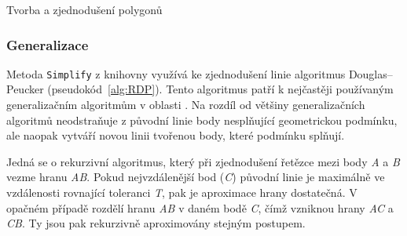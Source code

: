 \begin{algorithm}
\caption{Tvorba a zjednodušení polygonů}
\label{alg:polygon}
    \begin{algorithmic}[1] 
			\ELSE
			\ENDIF
		\ENDWHILE	
	\ENDWHILE
    \end{algorithmic}
\end{algorithm}

\newpage
\subsubsection{Generalizace}
	Metoda \texttt{Simplify} z knihovny  využívá ke zjednodušení linie algoritmus Douglas–Peucker (pseudokód~\ref{alg:RDP}). Tento algoritmus patří k nejčastěji používaným generalizačním algoritmům v oblasti . Na rozdíl od většiny generalizačních algoritmů neodstraňuje z původní linie body nesplňující geometrickou podmínku, ale naopak vytváří novou linii tvořenou body, které podmínku splňují. 
	
	Jedná se o rekurzivní algoritmus, který při zjednodušení řetězce mezi body \textit{A} a \textit{B} vezme hranu \textit{AB}. Pokud nejvzdálenější bod (\textit{C}) původní linie je maximálně ve vzdálenosti rovnající toleranci \textit{T}, pak je aproximace hrany dostatečná. V opačném případě rozdělí hranu \textit{AB} v daném bodě \textit{C}, čímž vzniknou hrany \textit{AC} a \textit{CB}. Ty jsou pak rekurzivně aproximovány stejným postupem. \cite{hershberger1992speeding}
	

